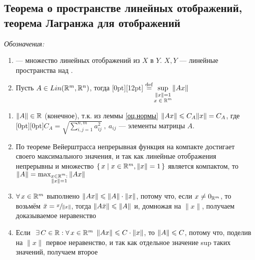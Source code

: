 \subsection{Теорема о пространстве линейных отображений, теорема Лагранжа для отображений}

\vspace{7pt plus 2pt minus 2pt}
\hangindent=20pt
\colorbox[rgb]{0.973, 1, 0.588}{\sffamily\itshape Обозначения:}\begin{enumerate}
	\item
	--- множество линейных отображений из $X$ в $Y$. $X, Y$ --- линейные пространства над \rr. \bigskip
	\item Пусть $A \in Lin(\mathbb R^m, \mathbb R^n)$, тогда
	 \raisebox{0pt}[0pt][12pt]{${}\eqdef \sup\limits_{\substack{\|x\| = 1 \\ \makebox[0pt]{\scriptsize$x \in \rmm$}}} \|Ax\|$}
	\end{enumerate}

\begin{zam}[https://youtu.be/OazzLm0DJN4?si=PGiZPb67g0zgXEMt&t=547]
	\begin{enumerate} 
		\item $\|A\| \in \mathbb R$ (конечное), т.к. из леммы \ref{оц.нормы} $\|Ax\| \leqslant C_A\|x\| = C_A$, где \raisebox{0pt}[0pt][0pt]{$C_A = \sqrt{\sum\limits_{i, j = 1}^{n, m}a_{ij}^2}\ ,\ a_{ij}$} --- элементы матрицы $A$.\medskip
		
		\item По теореме Вейерштрасса непрерывная функция на компакте достигает своего максимального значения, и так как линейные отображения непрерывны и множество $\{\, x \mid x \in \mathbb R^m, \|x\| = 1 \,\}$ является компактом, то $\|A\| = \max_{\substack{x \in \mathbb R^m: \\ \|x\| = 1}} \|Ax\|$  
		
		\item $\forall \, x \in \mathbb R^m$ выполнено $\|Ax\| \leqslant \|A\| \cdot \|x\|$, потому что, если $x \ne 0_{\mathbb R^m}$, то возьмём $\bar x = \sfrac{x}{\|x\|}$, тогда $\|A\bar x\| \leqslant \|A\|$ и, домножая на $\|x\|$, получаем доказываемое неравенство\medskip
		
		\item Если$\E C \in \rr : \A x \in \rmm$ $\|Ax\| \leqslant C \cdot \|x\|$, то $\|A\| \leqslant C$, потому что, поделив на $\|x\|$ первое неравенство, и так как отдельное значение \< sup таких значений, получаем второе
		\end{enumerate}
\end{zam}

